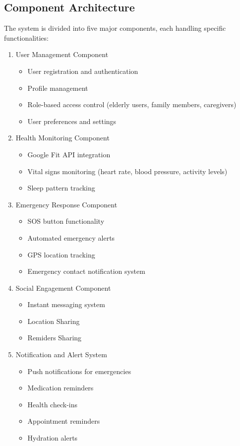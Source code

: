 \subsection{Component Architecture}
The system is divided into five major components, each handling specific functionalities:
        \begin{enumerate}
            \item User Management Component
                \begin{itemize}
                    \item User registration and authentication
                    \item Profile management
                    \item Role-based access control (elderly users, family members, caregivers) 
                    \item User preferences and settings
                \end{itemize}
            \item Health Monitoring Component
                \begin{itemize}
                    \item Google Fit API integration
                    \item Vital signs monitoring (heart rate, blood pressure, activity levels)
                    \item Sleep pattern tracking
                \end{itemize}
            \item Emergency Response Component
                \begin{itemize}
                    \item SOS button functionality
                    \item Automated emergency alerts
                    \item GPS location tracking
                    \item Emergency contact notification system
                \end{itemize}
            \item Social Engagement Component
                \begin{itemize}
                    \item Instant messaging system
                    \item Location Sharing
                    \item Remiders Sharing
                \end{itemize}
            \item Notification and Alert System
                \begin{itemize}
                    \item Push notifications for emergencies
                    \item Medication reminders
                    \item Health check-ins
                    \item Appointment reminders
                    \item Hydration alerts
                \end{itemize}
        \end{enumerate}
